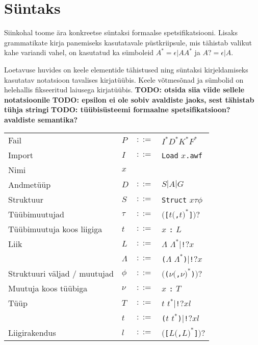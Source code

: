 \documentclass[12pt]{article}
\newcommand\peatykk[1]{
  \clearpage
  \section{#1}}
\newcommand\markus[1]{\textcolor{roheline}{\textbf{#1}}}
\begin{document}
  \peatykk{Süntaks}\label{syntaks}
    Siinkohal toome ära konkreetse süntaksi formaalse spetsifikatsiooni. Lisaks grammatikate kirja panemiseks kasutatavale püstkriipsule, mis tähistab valikut kahe variandi vahel, on kasutatud ka sümboleid $A^*=\epsilon|AA^*$ ja $A?=\epsilon|A$.

    Loetavuse huvides on keele elementide tähistused ning süntaksi kirjeldamiseks kasutatav notatsioon tavalises kirjatüübis. Keele võtmesõnad ja sümbolid on helehallis fikseeritud laiusega kirjatüübis. \markus{TODO: otsida siia viide sellele notatsioonile} \markus{TODO: epsilon ei ole sobiv avaldiste jaoks, sest tähistab tühja stringi} \markus{TODO: tüübisüsteemi formaalne spetsifikatsioon? avaldiste semantika?}

    \begin{tabular}{llll}
      Fail & $P$ & $::=$ & $I^*D^*K^*F^*$ \\
      Import & $I$ & $::=$ & {\color{helehall}\verb!Load!} $x${\color{helehall}\verb!.awf!} \\
      Nimi & $x$ &  &  \\
      Andmetüüp & $D$ & $::=$ & $S|A|G$ \\
      Struktuur & $S$ & $::=$ & {\color{helehall}\verb!Struct!} $x\tau\phi$ \\
      Tüübimuutujad & $\tau$ & $::=$ & $(${\color{helehall}\verb![!}$t(${\color{helehall}\verb!,!}$t)^*${\color{helehall}\verb!]!}$)?$ \\
      Tüübimuutuja koos liigiga & $t$ & $::=$ & $x$ {\color{helehall}\verb!:!} $L$ \\
      Liik & $L$ & $::=$ & $\Lambda$ $\Lambda^*|${\color{helehall}\verb"!"}$?x$ \\
       & $\Lambda$ & $::=$ & {\color{helehall}\verb!(!}$\Lambda$ $\Lambda^*${\color{helehall}\verb!)!}$|${\color{helehall}\verb"!"}$?x$ \\
      Struktuuri väljad / muutujad & $\phi$ & $::=$ & $(${\color{helehall}\verb!(!}$\nu(${\color{helehall}\verb!,!}$\nu)^*${\color{helehall}\verb!)!}$)?$ \\
      Muutuja koos tüübiga & $\nu$ & $::=$ & $x$ {\color{helehall}\verb!:!} $T$ \\
      Tüüp & $T$ & $::=$ & $t$ $t^*|${\color{helehall}\verb"!"}$?xl$ \\
       & $t$ & $::=$ & {\color{helehall}\verb!(!}$t$ $t^*${\color{helehall}\verb!)!}$|${\color{helehall}\verb"!"}$?xl$ \\
      Liigirakendus & $l$ & $::=$ & $(${\color{helehall}\verb"["}$L(${\color{helehall}\verb","}$L)^*${\color{helehall}\verb"]"}$)?$ \\

\end{tabular}
\end{document}
